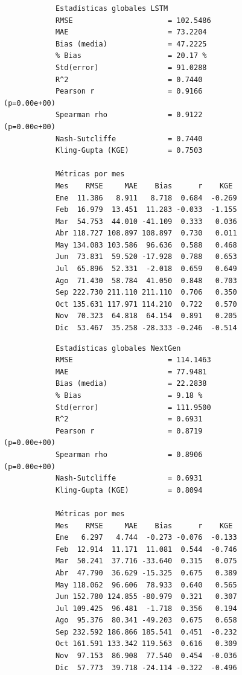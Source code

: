 \begin{figure}[H]
	\centering
	\begin{minipage}[t]{0.49\textwidth}
		\centering
		\scriptsize
		\begin{verbatim}
			Estadísticas globales LSTM
			RMSE                      = 102.5486
			MAE                       = 73.2204
			Bias (media)              = 47.2225
			% Bias                    = 20.17 %
			Std(error)                = 91.0288
			R^2                       = 0.7440
			Pearson r                 = 0.9166  (p=0.00e+00)
			Spearman rho              = 0.9122  (p=0.00e+00)
			Nash-Sutcliffe            = 0.7440
			Kling-Gupta (KGE)         = 0.7503
			
			Métricas por mes
			Mes    RMSE     MAE    Bias      r    KGE
			Ene  11.386   8.911   8.718  0.684  -0.269
			Feb  16.979  13.451  11.283 -0.033  -1.155
			Mar  54.753  44.010 -41.109  0.333   0.036
			Abr 118.727 108.897 108.897  0.730   0.011
			May 134.083 103.586  96.636  0.588   0.468
			Jun  73.831  59.520 -17.928  0.788   0.653
			Jul  65.896  52.331  -2.018  0.659   0.649
			Ago  71.430  58.784  41.050  0.848   0.703
			Sep 222.730 211.110 211.110  0.706   0.350
			Oct 135.631 117.971 114.210  0.722   0.570
			Nov  70.323  64.818  64.154  0.891   0.205
			Dic  53.467  35.258 -28.333 -0.246  -0.514
		\end{verbatim}
		\normalsize
	\end{minipage}
	\hfill
	\begin{minipage}[t]{0.49\textwidth}
		\centering
		\scriptsize
		\begin{verbatim}
			Estadísticas globales NextGen
			RMSE                      = 114.1463
			MAE                       = 77.9481
			Bias (media)              = 22.2838
			% Bias                    = 9.18 %
			Std(error)                = 111.9500
			R^2                       = 0.6931
			Pearson r                 = 0.8719  (p=0.00e+00)
			Spearman rho              = 0.8906  (p=0.00e+00)
			Nash-Sutcliffe            = 0.6931
			Kling-Gupta (KGE)         = 0.8094
			
			Métricas por mes
			Mes    RMSE     MAE    Bias      r    KGE
			Ene   6.297   4.744  -0.273 -0.076  -0.133
			Feb  12.914  11.171  11.081  0.544  -0.746
			Mar  50.241  37.716 -33.640  0.315   0.075
			Abr  47.790  36.629 -15.325  0.675   0.389
			May 118.062  96.606  78.933  0.640   0.565
			Jun 152.780 124.855 -80.979  0.321   0.307
			Jul 109.425  96.481  -1.718  0.356   0.194
			Ago  95.376  80.341 -49.203  0.675   0.658
			Sep 232.592 186.866 185.541  0.451  -0.232
			Oct 161.591 133.342 119.563  0.616   0.309
			Nov  97.153  86.908  77.540  0.454  -0.036
			Dic  57.773  39.718 -24.114 -0.322  -0.496
		\end{verbatim}
		\normalsize
	\end{minipage}
\end{figure}


